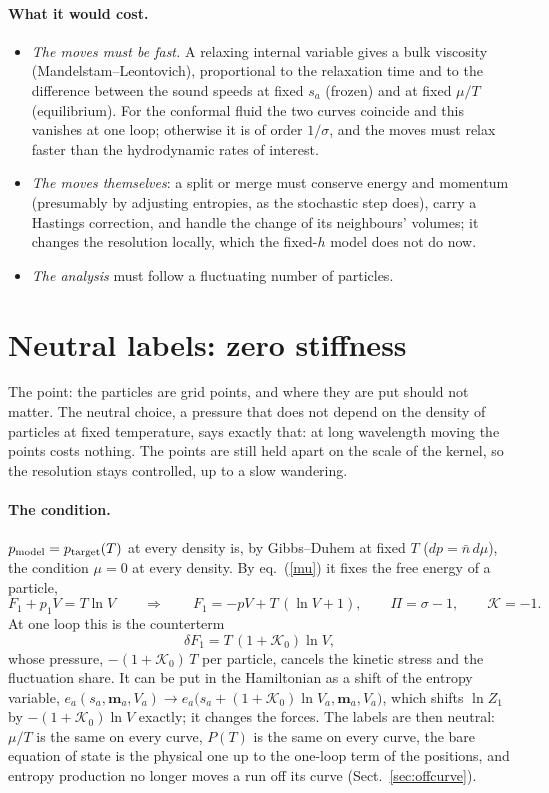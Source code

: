 \documentclass[11pt,aps,preprint,nofootinbib,superscriptaddress,tightenlines]{revtex4-2}
\def\st{\begin{equation}}
\def\stp{\end{equation}}
\def\Eq#1{eq.~(\ref{#1})}
\def\Sect#1{Sect.~\ref{#1}}
\let\oldparagraph\paragraph
\renewcommand{\paragraph}{\par\bigskip\oldparagraph}
\begin{document}
\paragraph{What it would cost.}
\begin{itemize}
\item \emph{The moves must be fast.}  A relaxing internal variable gives a bulk viscosity (Mandelstam--Leontovich), proportional to the relaxation time and to the
  difference between the sound speeds at fixed $s_a$ (frozen) and at fixed $\mu/T$ (equilibrium).  For the conformal fluid the two curves coincide and this vanishes at
  one loop; otherwise it is of order $1/\sigma$, and the moves must relax faster than the hydrodynamic rates of interest.
\item \emph{The moves themselves}: a split or merge must conserve energy and momentum (presumably by adjusting entropies, as the stochastic step does), carry a
  Hastings correction, and handle the change of its neighbours' volumes; it changes the resolution locally, which the fixed-$h$ model does not do now.
\item \emph{The analysis} must follow a fluctuating number of particles.
\end{itemize}

\section{Neutral labels: zero stiffness}
\label{sec:notallowed}

The point: the particles are grid points, and where they are put should not matter.  The neutral choice, a pressure that does not depend on the density of
particles at fixed temperature, says exactly that: at long wavelength moving the points costs nothing.  The points are still held apart on the scale of the
kernel, so the resolution stays controlled, up to a slow wandering.

\paragraph{The condition.}  $p_{\rm model}=p_{\rm target}(T)$ at every density is, by Gibbs--Duhem at fixed $T$ ($dp=\bar n\,d\mu$), the condition $\mu=0$ at
every density.  By \Eq{mu} it fixes the free energy of a particle,
\st
F_1+p_1V=T\ln V\qquad\Longrightarrow\qquad F_1=-pV+T\,(\ln V+1),\qquad \Pi=\sigma-1,\qquad \mathcal K=-1 .
\stp
At one loop this is the counterterm
\st
\delta F_1=T\,(1+\mathcal K_0)\ln V ,
\stp
whose pressure, $-(1+\mathcal K_0)\,T$ per particle, cancels the kinetic stress and the fluctuation share.  It can be put in the Hamiltonian as a shift of the
entropy variable, $e_a(s_a,\bm m_a,V_a)\to e_a\big(s_a+(1+\mathcal K_0)\ln V_a,\bm m_a,V_a\big)$, which shifts $\ln Z_1$ by $-(1+\mathcal K_0)\ln V$ exactly; it
changes the forces.  The labels are then neutral: $\mu/T$ is the same on every curve, $P(T)$ is the same on every curve, the bare equation of state is the physical
one up to the one-loop term of the positions, and entropy production no longer moves a run off its curve (\Sect{sec:offcurve}).
\end{document}
